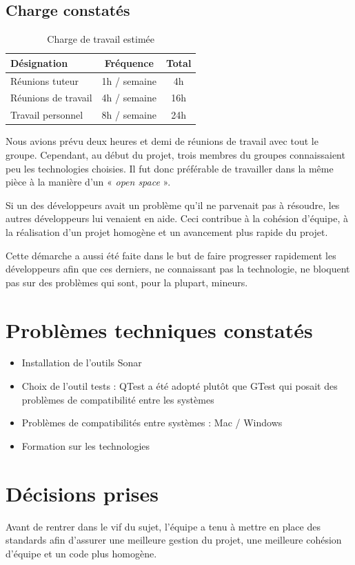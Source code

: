 \documentclass[12pt,a4paper,openany]{article}
\begin{document}
	\subsection{Charge constatés}
	\begin{table}[H]
		\centering
		\begin{tabular}{l|c|c}
			\textbf{Désignation} & \textbf{Fréquence} & \textbf{Total}\\
			\hline
			Réunions tuteur & 1h / semaine & 4h\\
			Réunions de travail & 4h / semaine & 16h\\
			Travail personnel & 8h / semaine & 24h
		\end{tabular}
		\caption{Charge de travail estimée}
	\end{table}
	Nous avions prévu deux heures et demi de réunions de travail avec tout le groupe. Cependant, au début du projet, trois membres du groupes
	connaissaient peu les technologies choisies. Il fut donc préférable de travailler dans la même pièce à la manière d’un « \textit{open space} ». 
	
	Si un des développeurs avait un problème qu'il ne parvenait pas à résoudre, les autres développeurs lui venaient en aide. Ceci contribue à la cohésion
	d'équipe, à la réalisation d’un projet homogène et un avancement plus rapide du projet. 
	
	Cette démarche a aussi été faite dans le but de faire
	progresser rapidement les développeurs afin que ces derniers, ne connaissant pas la technologie, ne bloquent pas sur des problèmes qui sont, pour
	la plupart, mineurs.

	\section{Problèmes techniques constatés}
	\begin{itemize}
		\item Installation de l'outils Sonar
		\item Choix de l'outil tests : QTest a été adopté plutôt que GTest qui posait des problèmes de compatibilité entre les systèmes 
		\item Problèmes de compatibilités entre systèmes : Mac / Windows
		\item Formation sur les technologies
	\end{itemize}
	\section{Décisions prises}
	Avant de rentrer dans le vif du sujet, l'équipe a tenu à mettre en place des standards afin d’assurer une meilleure gestion du projet, une
	meilleure cohésion d’équipe et un code plus homogène. 
\end{document}

